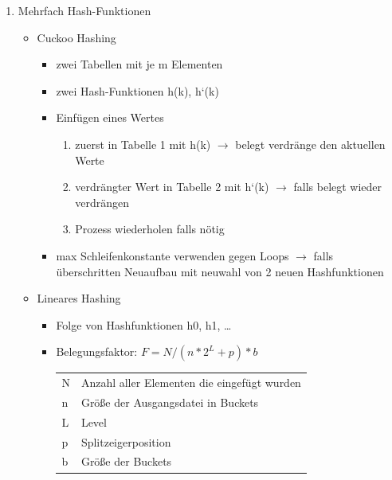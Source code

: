 \documentclass[a4paper]{article}
\begin{document}
\begin{enumerate}
        \item Mehrfach Hash-Funktionen
        \begin{itemize}
            \item Cuckoo Hashing
            \begin{itemize}
                \item zwei Tabellen mit je m Elementen 
                \item zwei Hash-Funktionen h(k), h‘(k)
                \item Einfügen eines Wertes
                \begin{enumerate}
                    \item zuerst in Tabelle 1 mit h(k) $\to$ belegt verdränge den aktuellen Werte
                    \item verdrängter Wert in Tabelle 2 mit h‘(k) $\to$ falls belegt wieder verdrängen
                    \item Prozess wiederholen falls nötig
                \end{enumerate}
                
                \item max Schleifenkonstante verwenden gegen Loops $\to$ falls überschritten Neuaufbau mit neuwahl von 2 neuen Hashfunktionen
            \end{itemize}
        
            \item Lineares Hashing
            \begin{itemize}
                \item Folge von Hashfunktionen h0, h1, …
                \item Belegungsfaktor: $F = N / (n * 2^L + p)*b$ \\
                \begin{tabular}{l l}
                    N & Anzahl aller Elementen die eingefügt wurden\\
                    n & Größe der Ausgangsdatei in Buckets \\
                    L & Level \\
                    p & Splitzeigerposition \\
                    b & Größe der Buckets
                \end{tabular}
                

\end{itemize}
\end{itemize}
\end{enumerate}
\end{document}
